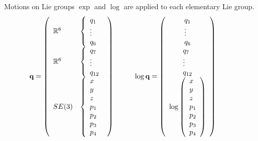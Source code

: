 \begin{frame} {Motions on Lie groups}
  $\exp$ and $\log$ are applied to each elementary Lie group.
  $$\textbf{q}=
  \left(
  \begin{array}{ll}
    \mathbb{R}^6 &\left\{\begin{array}{l}q_1 \\ \vdots \\ q_6 \end{array}\right.\\
    \mathbb{R}^6 &\left\{\begin{array}{l} q_7 \\ \vdots \\ q_{12} \end{array}\right.\\
    SE(3)  &\left\{\begin{array}{l} x \\ y \\ z \\ p_1 \\ p_2 \\ p_3 \\ p_4\end{array}\right.
  \end{array}\right) \hspace*{1cm}
  \log\textbf{q}=
  \left(
  \begin{array}{c}
    \begin{array}{l}q_1 \\ \vdots \\ q_6 \end{array}\\
    \begin{array}{l} q_7 \\ \vdots \\ q_{12} \end{array}\\
    \log\left(\begin{array}{l} x \\ y \\ z \\ p_1 \\ p_2 \\ p_3 \\ p_4\end{array}\right)
  \end{array}\right) \hspace*{1cm}
  $$
\end{frame}

